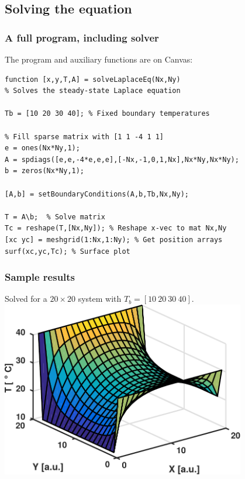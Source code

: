 \documentclass[11pt,table,final,xcolor={usenames,dvipsnames,table}]{beamer}
\begin{document}
\subsection*{Solving the equation}
\begin{frame}[fragile]
  \frametitle{A full program, including solver}
  The program and auxiliary functions are on Canvas:
\begin{lstlisting}[linewidth=1.05\textwidth]
function [x,y,T,A] = solveLaplaceEq(Nx,Ny)
% Solves the steady-state Laplace equation 

Tb = [10 20 30 40]; % Fixed boundary temperatures

% Fill sparse matrix with [1 1 -4 1 1]
e = ones(Nx*Ny,1);
A = spdiags([e,e,-4*e,e,e],[-Nx,-1,0,1,Nx],Nx*Ny,Nx*Ny);
b = zeros(Nx*Ny,1);

[A,b] = setBoundaryConditions(A,b,Tb,Nx,Ny);

T = A\b;  % Solve matrix
Tc = reshape(T,[Nx,Ny]); % Reshape x-vec to mat Nx,Ny
[xc yc] = meshgrid(1:Nx,1:Ny); % Get position arrays
surf(xc,yc,Tc); % Surface plot
\end{lstlisting}
\end{frame}

\begin{frame}[fragile]
  \frametitle{Sample results}
  Solved for a $20\times20$ system with $T_b=\left[10\ 20\ 30\ 40\right]$.
    \includegraphics[width=0.8\textwidth]{img/laplace_20x20}
\end{frame}
\end{document}
